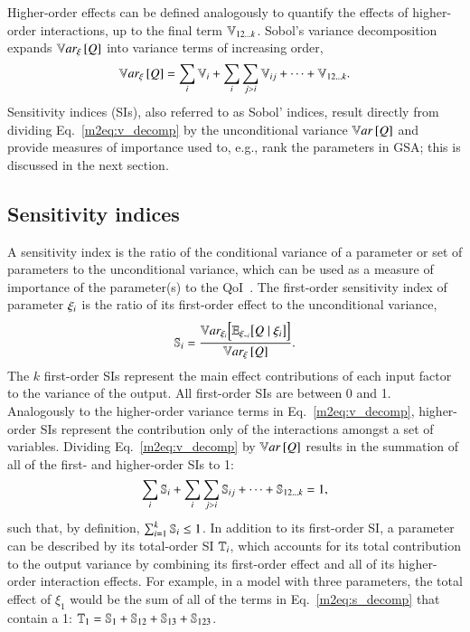 Higher-order effects can be defined analogously to quantify the effects of higher-order interactions, up to the final term $\V{12 \ldots k}$.
Sobol's variance decomposition expands $\Vxi{Q}$ into variance terms of increasing order,
\begin{equation} \label{m2eq:v_decomp}
    \Vxi{Q} = \sum_i \V{i} + \sum_i \sum_{j > i} \V{ij} + \cdots + \V{12 \ldots k} .
\end{equation}
Sensitivity indices (SIs), also referred to as Sobol' indices, result directly from dividing Eq.~\eqref{m2eq:v_decomp} by the unconditional variance $\Var{Q}$ and provide measures of importance used to, e.g., rank the parameters in GSA; this is discussed in the next section.

\subsection{Sensitivity indices}
A sensitivity index is the ratio of the conditional variance of a parameter or set of parameters to the unconditional variance, which can be used as a measure of importance of the parameter(s) to the QoI~\cite{sobol-1993, homma-saltelli-1996, hora-iman-1986, ishigami-homma-1990, iman-hora-1990}.
The first-order sensitivity index of parameter $\xii$ is the ratio of its first-order effect to the unconditional variance,
\begin{equation} \label{m2eq:si}
    \S{i} = \frac{\VEi{Q \mid \xii}}{\Vxi{Q}} .
\end{equation}
The $k$ first-order SIs represent the main effect contributions of each input factor to the variance of the output.
All first-order SIs are between 0 and 1.
Analogously to the higher-order variance terms in Eq.~\eqref{m2eq:v_decomp}, higher-order SIs represent the contribution only of the interactions amongst a set of variables. 
Dividing Eq.~\eqref{m2eq:v_decomp} by $\Var{Q}$ results in the summation of all of the first- and higher-order SIs to 1:
\begin{equation} \label{m2eq:s_decomp}
    \sum_i \S{i} + \sum_i \sum_{j > i} \S{ij} + \cdots + \S{12 \ldots k} = 1,
\end{equation}
such that, by definition, $\sum_{i=1}^k \S{i} \leq 1$. 
In addition to its first-order SI, a parameter can be described by its total-order SI $\T{i}$, which accounts for its total contribution to the output variance by combining its first-order effect and all of its higher-order interaction effects.
For example, in a model with three parameters, the total effect of $\xi_1$ would be the sum of all of the terms in Eq.~\eqref{m2eq:s_decomp} that contain a 1: $\T{1} = \S{1} + \S{12} + \S{13} + \S{123}$. 
